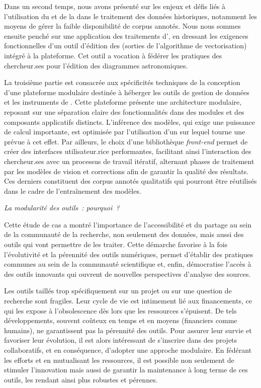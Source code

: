 Dans un second temps, nous avons présenté sur les enjeux et défis liés à l'utilisation du \dl et de la \cv dans le traitement des données historiques, notamment les moyens de gérer la faible disponibilité de corpus annotés. Nous nous sommes ensuite penché sur une application des traitements d'\ia, en dressant les exigences fonctionnelles d'un outil d'édition des \svgs (sorties de l'algorithme de vectorisation) intégré à la plateforme. Cet outil a vocation à fédérer les pratiques des chercheur.ses pour l'édition des diagrammes astronomiques. 

La troisième partie est consacrée aux spécificités techniques de la conception d'une plateforme modulaire destinée à héberger les outils de gestion de données et les instruments de \cv. Cette plateforme présente une architecture modulaire, reposant sur une séparation claire des fonctionnalités dans des modules et des composants applicatifs distincts. L'inférence des modèles, qui exige une puissance de calcul importante, est optimisée par l'utilisation d'un \gpu sur lequel tourne une \api prévue à cet effet. Par ailleurs, le choix d'une bibliothèque \textit{front-end} permet de créer des interfaces utilisateur.rice performantes, facilitant ainsi l'interaction des chercheur.ses avec un processus de travail itératif, alternant phases de traitement par les modèles de vision et corrections afin de garantir la qualité des résultats. Ces derniers constituent des corpus annotés qualitatifs qui pourront être réutilisés dans le cadre de l'entraînement des modèles. 

\textit{La modularité des outils~: pourquoi~?} 

Cette étude de cas a montré l'importance de l'accessibilité et du partage au sein de la communauté de la recherche, non seulement des données, mais aussi des outils qui vont permettre de les traiter. Cette démarche favorise à la fois l'évolutivité et la pérennité des outils numériques, permet d'établir des pratiques communes au sein de la communauté scientifique et, enfin, démocratise l'accès à des outils innovants qui ouvrent de nouvelles perspectives d'analyse des sources.

Les outils taillés trop spécifiquement sur un projet ou sur une question de recherche sont fragiles. Leur cycle de vie est intimement lié aux financements, ce qui les expose à l'obsolescence dès lors que les ressources s'épuisent. De tels développements, souvent coûteux en temps et en moyens (financiers comme humains), ne garantissent pas la pérennité des outils. Pour assurer leur survie et favoriser leur évolution, il est alors intéressant de s'inscrire dans des projets collaboratifs, et en conséquence, d'adopter une approche modulaire. En fédérant les efforts et en mutualisant les ressources, il est possible non seulement de stimuler l'innovation mais aussi de garantir la maintenance à long terme de ces outils, les rendant ainsi plus robustes et pérennes.


